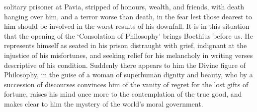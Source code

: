 \documentclass[12pt]{book}
\begin{document}
solitary prisoner at Pavia, stripped of honours, wealth, and friends,
with death hanging over him, and a terror worse than death, in the fear
lest those dearest to him should be involved in the worst results of his
downfall. It is in this situation that the opening of the `Consolation
of Philosophy' brings Boethius before us. He represents himself as
seated in his prison distraught with grief, indignant at the injustice
of his misfortunes, and seeking relief for his melancholy in writing
verses descriptive of his condition. Suddenly there appears to him the
Divine figure of Philosophy, in the guise of a woman of superhuman
dignity and beauty, who by a succession of discourses convinces him of
the vanity of regret for the lost gifts of fortune, raises his mind once
more to the contemplation of the true good, and makes clear to him the
mystery of the world's moral government.

\tableofcontents
\end{document}
